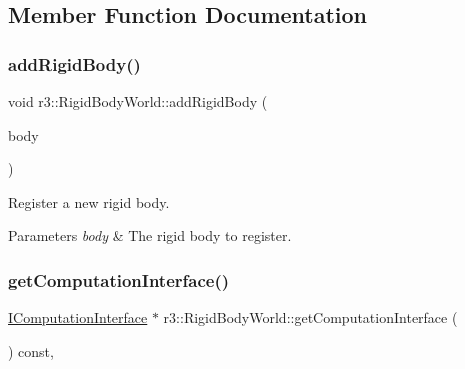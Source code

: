 \subsection{Member Function Documentation}
\mbox{\label{classr3_1_1_rigid_body_world_ae743b90995308445e9ef985e3fde8f8f}} 
\subsubsection{\texorpdfstring{add\+Rigid\+Body()}{addRigidBody()}}
{\footnotesize\ttfamily void r3\+::\+Rigid\+Body\+World\+::add\+Rigid\+Body (\begin{DoxyParamCaption}\item[{\mbox{\hyperlink{classr3_1_1_rigid_body}{Rigid\+Body}} $\ast$}]{body }\end{DoxyParamCaption})}



Register a new rigid body. 


\begin{DoxyParams}{Parameters}
{\em body} & The rigid body to register. \\
\hline
\end{DoxyParams}
\mbox{\label{classr3_1_1_rigid_body_world_ac25b39a5b15666d99f42b68f29f8a97b}} 
\subsubsection{\texorpdfstring{get\+Computation\+Interface()}{getComputationInterface()}}
{\footnotesize\ttfamily \mbox{\hyperlink{classr3_1_1_i_computation_interface}{I\+Computation\+Interface}} $\ast$ r3\+::\+Rigid\+Body\+World\+::get\+Computation\+Interface (\begin{DoxyParamCaption}{ }\end{DoxyParamCaption}) const\hspace{0.3cm}{\ttfamily [override]}, {\ttfamily [virtual]}}



